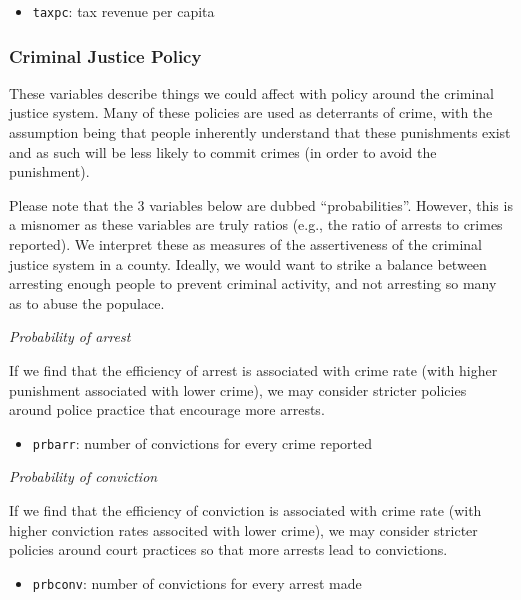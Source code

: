 \documentclass[]{article}
\providecommand{\tightlist}{%
  \setlength{\itemsep}{0pt}\setlength{\parskip}{0pt}}
\begin{document}
\begin{itemize}
\tightlist
\item
  \texttt{taxpc}: tax revenue per capita
\end{itemize}

\hypertarget{criminal-justice-policy}{%
\subsubsection{Criminal Justice Policy}\label{criminal-justice-policy}}

These variables describe things we could affect with policy around the
criminal justice system. Many of these policies are used as deterrants
of crime, with the assumption being that people inherently understand
that these punishments exist and as such will be less likely to commit
crimes (in order to avoid the punishment).

Please note that the 3 variables below are dubbed ``probabilities''.
However, this is a misnomer as these variables are truly ratios (e.g.,
the ratio of arrests to crimes reported). We interpret these as measures
of the assertiveness of the criminal justice system in a county.
Ideally, we would want to strike a balance between arresting enough
people to prevent criminal activity, and not arresting so many as to
abuse the populace.

\emph{Probability of arrest}

If we find that the efficiency of arrest is associated with crime rate
(with higher punishment associated with lower crime), we may consider
stricter policies around police practice that encourage more arrests.

\begin{itemize}
\tightlist
\item
  \texttt{prbarr}: number of convictions for every crime reported
\end{itemize}

\emph{Probability of conviction}

If we find that the efficiency of conviction is associated with crime
rate (with higher conviction rates associted with lower crime), we may
consider stricter policies around court practices so that more arrests
lead to convictions.

\begin{itemize}
\tightlist
\item
  \texttt{prbconv}: number of convictions for every arrest made
\end{itemize}
\end{document}
